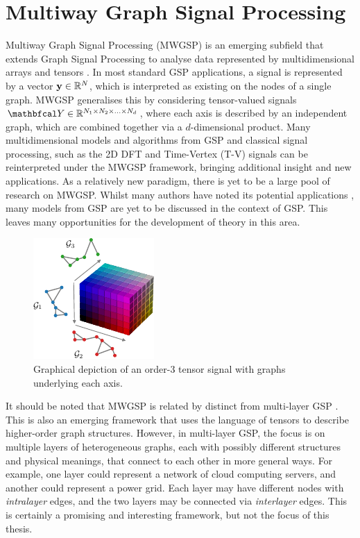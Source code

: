 \section{Multiway Graph Signal Processing}

Multiway Graph Signal Processing (MWGSP) is an emerging subfield that extends Graph Signal Processing to analyse data represented by multidimensional arrays and tensors \citep{Stanley2020}. In most standard GSP applications, a signal is represented by a vector $\mathbf{y} \in \mathbb{R}^N$, which is interpreted as existing on the nodes of a single graph. MWGSP generalises this by considering tensor-valued signals $\Yt \in \R^{N_1 \times N_2 \times ... \times N_d}$, where each axis is described by an independent graph, which are combined together via a $d$-dimensional product. Many multidimensional models and algorithms from GSP and classical signal processing, such as the 2D DFT and Time-Vertex (T-V) signals can be reinterpreted under the MWGSP framework, bringing additional insight and new applications. As a relatively new paradigm, there is yet to be a large pool of research on MWGSP. Whilst many authors have noted its potential applications \citep{Marques2020b,Li2023}, many models from GSP are yet to be discussed in the context of GSP. This leaves many opportunities for the development of theory in this area. 

\begin{figure}[t]
    \centering
    \includegraphics[width=0.45\linewidth]{Figures/colored_tensor.pdf}
    \caption[Graphical depiction of an order-3 tensor]{Graphical depiction of an order-3 tensor signal with graphs underlying each axis.} 
    \label{fig:coloured_tensor}
\end{figure}   

It should be noted that MWGSP is related by distinct from multi-layer GSP \citep{Zhang2023b}. This is also an emerging framework that uses the language of tensors to describe higher-order graph structures. However, in multi-layer GSP, the focus is on multiple layers of heterogeneous graphs, each with possibly different structures and physical meanings, that connect to each other in more general ways. For example, one layer could represent a network of cloud computing servers, and another could represent a power grid. Each layer may have different nodes with \textit{intralayer} edges, and the two layers may be connected via \textit{interlayer} edges. This is certainly a promising and interesting framework, but not the focus of this thesis. 


